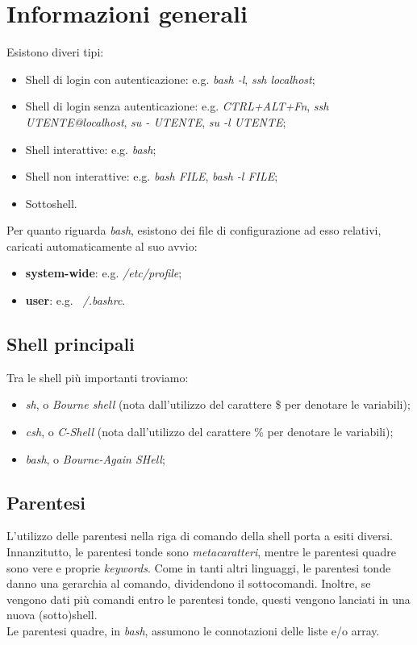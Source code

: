 \section{Informazioni generali}
Esistono diveri tipi:
\begin{itemize}
	\item Shell di login con autenticazione: e.g. \textit{bash -l}, \textit{ssh localhost};
	\item Shell di login senza autenticazione: e.g. \textit{CTRL+ALT+Fn}, \textit{ssh UTENTE@localhost}, \textit{su - UTENTE}, \textit{su -l UTENTE};
	\item Shell interattive: e.g. \textit{bash};
	\item Shell non interattive: e.g. \textit{bash FILE}, \textit{bash -l FILE};
	\item Sottoshell.
\end{itemize}
Per quanto riguarda \textit{bash}, esistono dei file di configurazione ad esso relativi, caricati automaticamente al suo avvio:
\begin{itemize}
	\item \textbf{system-wide}: e.g. \textit{/etc/profile};
	\item \textbf{user}: e.g. \textit{~/.bashrc}.
\end{itemize}

\subsection{Shell principali}
Tra le shell più importanti troviamo:
\begin{itemize}
	\item \textit{sh}, o \textit{Bourne shell} (nota dall'utilizzo del carattere \$ per denotare le variabili);
	\item \textit{csh}, o \textit{C-Shell} (nota dall'utilizzo del carattere \% per denotare le variabili);
	\item \textit{bash}, o \textit{Bourne-Again SHell};
\end{itemize}

\subsection{Parentesi}
L'utilizzo delle parentesi nella riga di comando della shell porta a esiti diversi. \\
Innanzitutto, le parentesi tonde sono \textit{metacaratteri}, mentre le parentesi quadre sono vere e proprie \textit{keywords}. Come in tanti altri linguaggi, le parentesi tonde danno una gerarchia al comando, dividendono il sottocomandi. Inoltre, se vengono dati più comandi entro le parentesi tonde, questi vengono lanciati in una nuova (sotto)shell. \\
Le parentesi quadre, in \textit{bash}, assumono le connotazioni delle liste e/o array.


